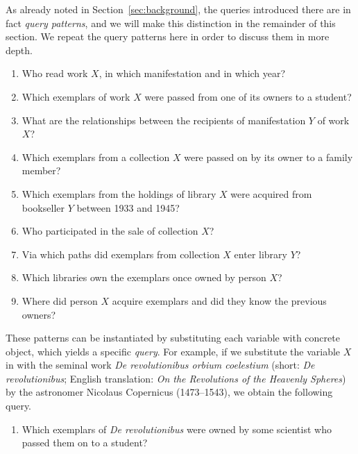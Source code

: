 As already noted in Section~\ref{sec:background}, the queries introduced there
are in fact \emph{query patterns}, and we will make this distinction in the remainder
of this section. We repeat the query patterns here in order to discuss them in more depth.
%
\begin{enumerate}
  \item[\exaquery{1}]
    Who read %
    work $X$, in which manifestation and in which year?
  \item[\exaquery{2}]
    Which exemplars
    of work $X$
    were passed from one of its owners to a student?
  \item[\exaquery{3}]
    What are the relationships between the recipients of manifestation $Y$ of work $X$?
  \item[\exaquery{4}]
    Which exemplars from a collection $X$ were passed on by its owner to a family member?
  \item[\exaquery{5}]
    Which exemplars from the holdings of library $X$ were acquired from bookseller $Y$
    between 1933 and 1945?
  \item[\exaquery{6}]
    Who participated in the sale of collection $X$?
  \item[\exaquery{7}]
    Via which paths did exemplars from collection $X$ enter library $Y$?
  \item[\exaquery{8}]
    Which libraries own the exemplars once owned by person $X$?
  \item[\exaquery{9}]
    Where did person $X$ acquire exemplars and did they know the previous owners?
\end{enumerate}
%
These patterns can be instantiated by substituting each variable with concrete object,
which yields a specific \emph{query}. For example, if we substitute the variable $X$
in  with the seminal work \emph{De revolutionibus orbium coelestium}
(short: \emph{De revolutionibus}; English translation: \emph{On the Revolutions of the Heavenly Spheres}) \autocite{Kopernikus1543}
by the astronomer Nicolaus Copernicus (1473–1543),
we obtain the following query.
%
\begin{enumerate}
  \item[\exaquery{2$'$}]
    Which exemplars of \emph{De revolutionibus} were owned by some scientist who passed them on to a student?
\end{enumerate}
